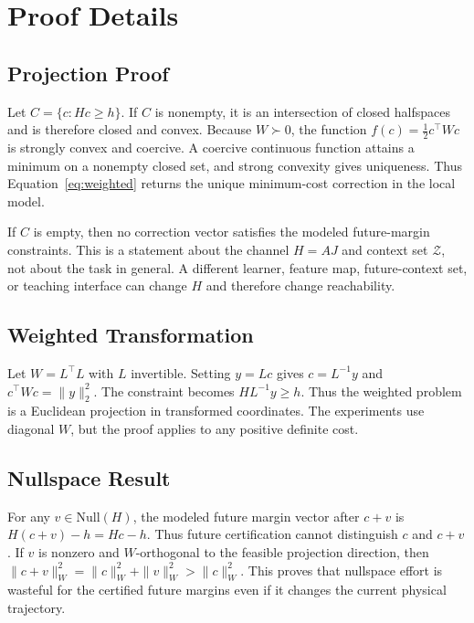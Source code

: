 \documentclass{article}
\begin{document}



\appendix

\section{Proof Details}
\label{app:proof}

\subsection{Projection Proof}

Let $C=\{c:Hc\ge h\}$. If $C$ is nonempty, it is an intersection of closed
halfspaces and is therefore closed and convex. Because $W\succ0$, the function
$f(c)=\frac12 c^\top Wc$ is strongly convex and coercive. A coercive continuous
function attains a minimum on a nonempty closed set, and strong convexity gives
uniqueness. Thus Equation~\ref{eq:weighted} returns the unique minimum-cost
correction in the local model.

If $C$ is empty, then no correction vector satisfies the modeled future-margin
constraints. This is a statement about the channel $H=AJ$ and context set
$\mathcal{Z}$, not about the task in general. A different learner, feature map,
future-context set, or teaching interface can change $H$ and therefore change
reachability.

\subsection{Weighted Transformation}

Let $W=L^\top L$ with $L$ invertible. Setting $y=Lc$ gives $c=L^{-1}y$ and
$c^\top Wc=\|y\|_2^2$. The constraint becomes $HL^{-1}y\ge h$. Thus the weighted
problem is a Euclidean projection in transformed coordinates. The experiments
use diagonal $W$, but the proof applies to any positive definite cost.

\subsection{Nullspace Result}

For any $v\in\mathrm{Null}(H)$, the modeled future margin vector after $c+v$ is
$H(c+v)-h=Hc-h$. Thus future certification cannot distinguish $c$ and $c+v$.
If $v$ is nonzero and $W$-orthogonal to the feasible projection direction, then
$\|c+v\|_W^2=\|c\|_W^2+\|v\|_W^2>\|c\|_W^2$. This proves that nullspace effort is
wasteful for the certified future margins even if it changes the current
physical trajectory.
\end{document}
